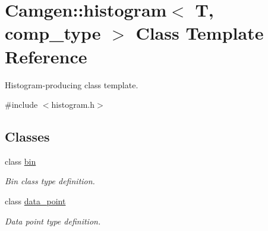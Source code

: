 \hypertarget{a00284}{}\section{Camgen\+:\+:histogram$<$ T, comp\+\_\+type $>$ Class Template Reference}
\label{a00284}


Histogram-\/producing class template.  




{\ttfamily \#include $<$histogram.\+h$>$}

\subsection*{Classes}
\begin{DoxyCompactItemize}
\item 
class \hyperlink{a00021}{bin}
\begin{DoxyCompactList}\small\item\em Bin class type definition. \end{DoxyCompactList}\item 
class \hyperlink{a00114}{data\+\_\+point}
\begin{DoxyCompactList}\small\item\em Data point type definition. \end{DoxyCompactList}\end{DoxyCompactItemize}
